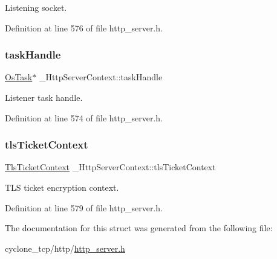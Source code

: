 Listening socket. 



Definition at line 576 of file http\+\_\+server.\+h.

\mbox{\label{struct__HttpServerContext_acd0f767dde1c3f6806df984502f5fda7}} 
\subsubsection{\texorpdfstring{task\+Handle}{taskHandle}}
{\footnotesize\ttfamily \hyperlink{structOsTask}{Os\+Task}$\ast$ \+\_\+\+Http\+Server\+Context\+::task\+Handle}



Listener task handle. 



Definition at line 574 of file http\+\_\+server.\+h.

\mbox{\label{struct__HttpServerContext_a13867077389bceb7d4b18d0fa6a20a3f}} 
\subsubsection{\texorpdfstring{tls\+Ticket\+Context}{tlsTicketContext}}
{\footnotesize\ttfamily \hyperlink{structTlsTicketContext}{Tls\+Ticket\+Context} \+\_\+\+Http\+Server\+Context\+::tls\+Ticket\+Context}



T\+LS ticket encryption context. 



Definition at line 579 of file http\+\_\+server.\+h.



The documentation for this struct was generated from the following file\+:\begin{DoxyCompactItemize}
\item 
cyclone\+\_\+tcp/http/\hyperlink{http__server_8h}{http\+\_\+server.\+h}\end{DoxyCompactItemize}
